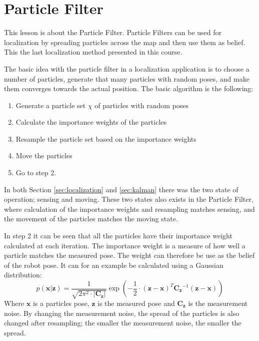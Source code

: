 \documentclass[Main]{subfiles}
\begin{document}
\section{Particle Filter} %
	\label{sec:particlefilter}
This lesson is about the Particle Filter. 
Particle Filters can be used for localization by spreading particles across the map and then use them as belief. 
This the last localization method presented in this course.

The basic idea with the particle filter in a localization application is to choose a number of particles, generate that many particles with random poses, and make them converges towards the actual position.
The basic algorithm is the following:
\begin{enumerate}
\item Generate a particle set $\chi$ of particles with random poses 
\item Calculate the importance weights of the particles 
\item Resample the particle set based on the importance weights
\item Move the particles
\item Go to step 2.
\end{enumerate}
In both Section \ref{sec:localization} and \ref{sec:kalman} there was the two state of operation; sensing and moving.
These two states also exists in the Particle Filter, where calculation of the importance weights and resampling matches sensing, and the movement of the particles matches the moving state.

In step 2 it can be seen that all the particles have their importance weight calculated at each iteration.
The importance weight is a measure of how well a particle matches the measured pose.
The weight can therefore be use as the belief of the robot pose.
It can for an example be calculated using a Gaussian distribution:
\begin{equation}
	p(\mathbf{x}|\mathbf{z}) = \frac{1}{\sqrt{2\pi^2 \cdot |\mathbf{C_z}|}} \exp \left( -\frac{1}{2}\cdot (\mathbf{z}-\mathbf{x})^T \mathbf{C_z}^{-1} (\mathbf{z}-\mathbf{x}) \right)
\end{equation}
Where $\mathbf{x}$ is a particles pose, $\mathbf{z}$ is the measured pose and $\mathbf{C_z}$ is the measurement noise.
By changing the measurement noise, the spread of the particles is also changed after resampling; the smaller the measurement noise, the smaller the spread.
\end{document}
